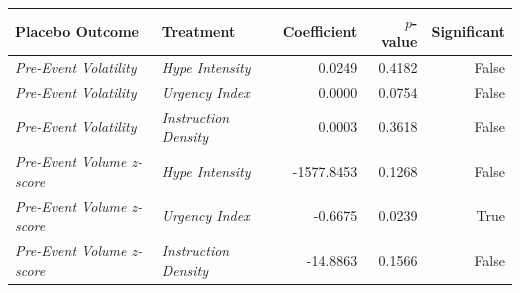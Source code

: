 \begin{tabular}{llrrr}
\toprule
Placebo Outcome & Treatment & Coefficient & $p$-value & Significant \\
\midrule
\textit{Pre-Event Volatility} & \textit{Hype Intensity} & 0.0249 & 0.4182 & False \\
\textit{Pre-Event Volatility} & \textit{Urgency Index} & 0.0000 & 0.0754 & False \\
\textit{Pre-Event Volatility} & \textit{Instruction Density} & 0.0003 & 0.3618 & False \\
\textit{Pre-Event Volume z-score} & \textit{Hype Intensity} & -1577.8453 & 0.1268 & False \\
\textit{Pre-Event Volume z-score} & \textit{Urgency Index} & -0.6675 & 0.0239 & True \\
\textit{Pre-Event Volume z-score} & \textit{Instruction Density} & -14.8863 & 0.1566 & False \\
\bottomrule
\end{tabular}
